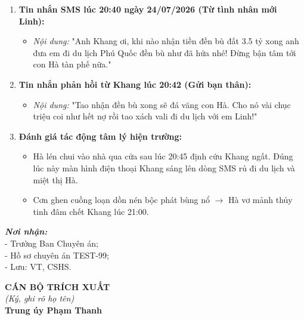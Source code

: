 \documentclass[12pt,a4paper]{article}
\begin{document}
\begin{enumerate}[label=\arabic*., leftmargin=1.5cm]
    \item \textbf{Tin nhắn SMS lúc 20:40 ngày 24/07/2026 (Từ tình nhân mới Linh):}
    \begin{itemize}[leftmargin=0.8cm]
        \item \textit{Nội dung:} "Anh Khang ơi, khi nào nhận tiền đền bù đất 3.5 tỷ xong anh đưa em đi du lịch Phú Quốc đền bù như đã hứa nhé! Đừng bận tâm tới con Hà tàn phế nữa."
    \end{itemize}

    \item \textbf{Tin nhắn phản hồi từ Khang lúc 20:42 (Gửi bạn thân):}
    \begin{itemize}[leftmargin=0.8cm]
        \item \textit{Nội dung:} "Tao nhận đền bù xong sẽ đá văng con Hà. Cho nó vài chục triệu coi như hết nợ rồi tao xách vali đi du lịch với em Linh!"
    \end{itemize}

    \item \textbf{Đánh giá tác động tâm lý hiện trường:}
    \begin{itemize}[leftmargin=0.8cm]
        \item Hà lén chui vào nhà qua cửa sau lúc 20:45 định cứu Khang ngất. Đúng lúc này màn hình điện thoại Khang sáng lên dòng SMS rủ đi du lịch và miệt thị Hà.
        \item Cơn ghen cuồng loạn dồn nén bộc phát bùng nổ $\rightarrow$ Hà vơ mảnh thủy tinh đâm chết Khang lúc 21:00.
    \end{itemize}
\end{enumerate}

\vspace{0.8cm}

\noindent
\begin{minipage}[t]{0.45\textwidth}
    \small
    \textbf{\textit{Nơi nhận:}}\\
    - Trưởng Ban Chuyên án;\\
    - Hồ sơ chuyên án TEST-99;\\
    - Lưu: VT, CSHS.
\end{minipage}
\hfill
\begin{minipage}[t]{0.5\textwidth}
    \begin{center}
        \small
        \textbf{CÁN BỘ TRÍCH XUẤT}\\
        \textit{(Ký, ghi rõ họ tên)}\\[1.5cm]
        \textbf{Trung úy Phạm Thanh}
    \end{center}
\end{minipage}
\end{document}
